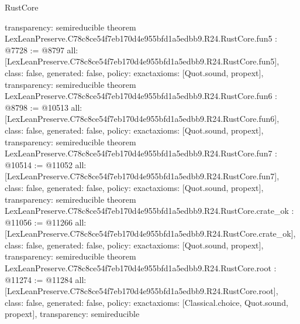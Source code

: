 \begin{lexlean}{RustCore}
\begin{coremodule}
{  transparency: semireducible
}
theorem LexLeanPreserve.C78c8ce54f7eb170d4e955bfd1a5edbb9.R24.RustCore.fun5 : @7728 := @8797 {
  all: [LexLeanPreserve.C78c8ce54f7eb170d4e955bfd1a5edbb9.R24.RustCore.fun5],
  class: false,
  generated: false,
  policy: exact{axioms: [Quot.sound, propext]},
  transparency: semireducible
}
theorem LexLeanPreserve.C78c8ce54f7eb170d4e955bfd1a5edbb9.R24.RustCore.fun6 : @8798 := @10513 {
  all: [LexLeanPreserve.C78c8ce54f7eb170d4e955bfd1a5edbb9.R24.RustCore.fun6],
  class: false,
  generated: false,
  policy: exact{axioms: [Quot.sound, propext]},
  transparency: semireducible
}
theorem LexLeanPreserve.C78c8ce54f7eb170d4e955bfd1a5edbb9.R24.RustCore.fun7 : @10514 := @11052 {
  all: [LexLeanPreserve.C78c8ce54f7eb170d4e955bfd1a5edbb9.R24.RustCore.fun7],
  class: false,
  generated: false,
  policy: exact{axioms: [Quot.sound, propext]},
  transparency: semireducible
}
theorem LexLeanPreserve.C78c8ce54f7eb170d4e955bfd1a5edbb9.R24.RustCore.crate_ok : @11056 := @11266 {
  all: [LexLeanPreserve.C78c8ce54f7eb170d4e955bfd1a5edbb9.R24.RustCore.crate_ok],
  class: false,
  generated: false,
  policy: exact{axioms: [Quot.sound, propext]},
  transparency: semireducible
}
theorem LexLeanPreserve.C78c8ce54f7eb170d4e955bfd1a5edbb9.R24.RustCore.root : @11274 := @11284 {
  all: [LexLeanPreserve.C78c8ce54f7eb170d4e955bfd1a5edbb9.R24.RustCore.root],
  class: false,
  generated: false,
  policy: exact{axioms: [Classical.choice, Quot.sound, propext]},
  transparency: semireducible
}


\end{coremodule}
\end{lexlean}
